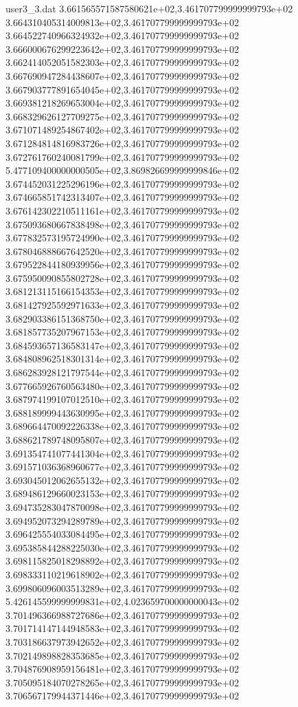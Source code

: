 \begin{filecontents}{user3_3.dat}
3.661565571587580621e+02,3.461707799999999793e+02
3.664310405314009813e+02,3.461707799999999793e+02
3.664522740966324932e+02,3.461707799999999793e+02
3.666000676299223642e+02,3.461707799999999793e+02
3.662414052051582303e+02,3.461707799999999793e+02
3.667690947284438607e+02,3.461707799999999793e+02
3.667903777891654045e+02,3.461707799999999793e+02
3.669381218269653004e+02,3.461707799999999793e+02
3.668329626127709275e+02,3.461707799999999793e+02
3.671071489254867402e+02,3.461707799999999793e+02
3.671284814816983726e+02,3.461707799999999793e+02
3.672761760240081799e+02,3.461707799999999793e+02
5.477109400000000505e+02,3.869826699999999846e+02
3.674452031225296196e+02,3.461707799999999793e+02
3.674665851742313407e+02,3.461707799999999793e+02
3.676142302210511161e+02,3.461707799999999793e+02
3.675093680667838498e+02,3.461707799999999793e+02
3.677832573195724990e+02,3.461707799999999793e+02
3.678046888667642520e+02,3.461707799999999793e+02
3.679522844180939956e+02,3.461707799999999793e+02
3.675950090855802728e+02,3.461707799999999793e+02
3.681213115166154353e+02,3.461707799999999793e+02
3.681427925592971633e+02,3.461707799999999793e+02
3.682903386151368750e+02,3.461707799999999793e+02
3.681857735207967153e+02,3.461707799999999793e+02
3.684593657136583147e+02,3.461707799999999793e+02
3.684808962518301314e+02,3.461707799999999793e+02
3.686283928121797544e+02,3.461707799999999793e+02
3.677665926760563480e+02,3.461707799999999793e+02
3.687974199107012510e+02,3.461707799999999793e+02
3.688189999443630995e+02,3.461707799999999793e+02
3.689664470092226338e+02,3.461707799999999793e+02
3.688621789748095807e+02,3.461707799999999793e+02
3.691354741077441304e+02,3.461707799999999793e+02
3.691571036368960677e+02,3.461707799999999793e+02
3.693045012062655132e+02,3.461707799999999793e+02
3.689486129660023153e+02,3.461707799999999793e+02
3.694735283047870098e+02,3.461707799999999793e+02
3.694952073294289789e+02,3.461707799999999793e+02
3.696425554033084495e+02,3.461707799999999793e+02
3.695385844288225030e+02,3.461707799999999793e+02
3.698115825018298892e+02,3.461707799999999793e+02
3.698333110219618902e+02,3.461707799999999793e+02
3.699806096003513289e+02,3.461707799999999793e+02
5.426145599999999831e+02,4.023659700000000043e+02
3.701496366988727686e+02,3.461707799999999793e+02
3.701714147144948583e+02,3.461707799999999793e+02
3.703186637973942652e+02,3.461707799999999793e+02
3.702149898828353685e+02,3.461707799999999793e+02
3.704876908959156481e+02,3.461707799999999793e+02
3.705095184070278265e+02,3.461707799999999793e+02
3.706567179944371446e+02,3.461707799999999793e+02

\end{filecontents}

